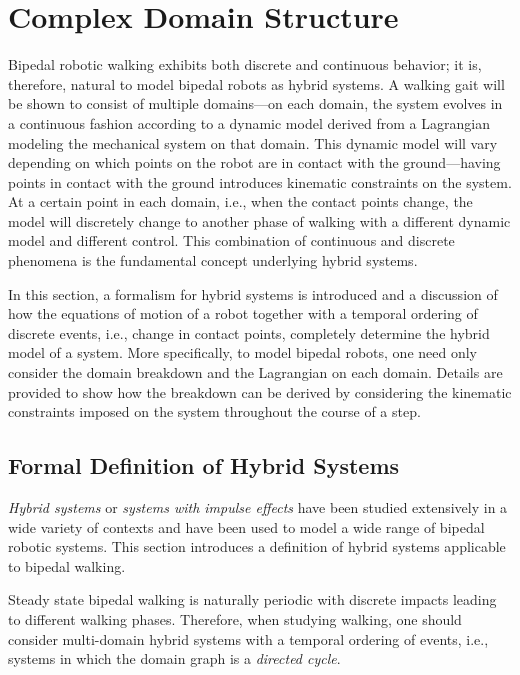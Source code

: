 \section{Complex Domain Structure}
Bipedal robotic walking exhibits both discrete and continuous behavior; it is, therefore, natural to model bipedal robots as hybrid systems. A walking gait will be shown to consist of multiple domains---on each domain, the system evolves in a continuous fashion according to a dynamic model derived from a Lagrangian modeling the mechanical system on that domain. This dynamic model will vary depending on which points on the robot are in contact with the ground---having points in contact with the ground introduces kinematic constraints on the system. At a certain point in each domain, i.e., when the contact points change, the model will discretely change to another phase of walking with a different dynamic model and different control. This combination of continuous and discrete phenomena is the fundamental concept underlying hybrid systems.

In this section, a formalism for hybrid systems is introduced and a discussion of how the equations of motion of a robot together with a temporal ordering of discrete events, i.e., change in contact points, completely determine the hybrid model of a system. More specifically, to model bipedal robots, one need only consider the domain breakdown and the Lagrangian on each domain. Details are provided to show how the breakdown can be derived by considering the kinematic constraints imposed on the system throughout the course of a step.


\subsection{Formal Definition of Hybrid Systems}
{\em Hybrid systems} or {\em systems with impulse effects}\cite{GAP01}\xspace have been studied extensively in a wide variety of contexts and have been used to model a wide range of bipedal robotic systems.\cite{GCAS10}\xspace This section introduces a definition of hybrid systems applicable to bipedal walking.

Steady state bipedal walking is naturally periodic with discrete impacts leading to different walking phases. Therefore, when studying walking, one should consider multi-domain hybrid systems with a temporal ordering of events, i.e., systems in which the domain graph is a {\em directed cycle}.


